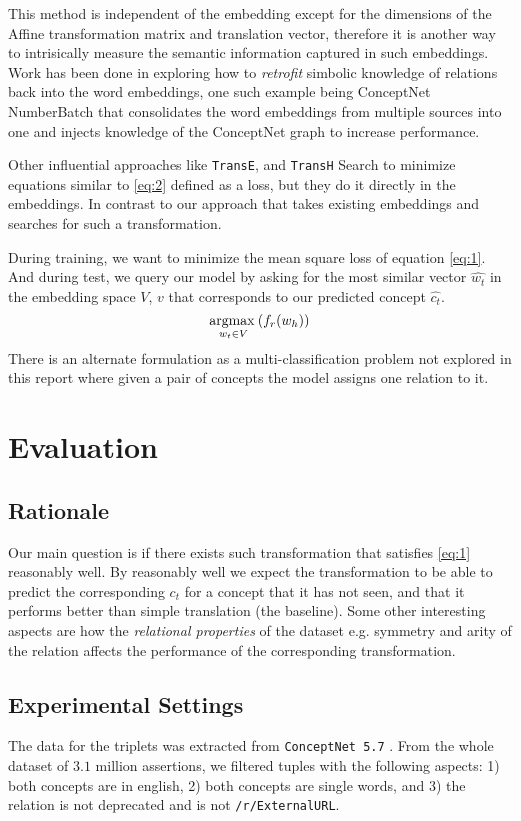 This method is independent of the embedding except for the dimensions of the Affine transformation matrix and translation vector,
therefore it is another way to intrisically measure the semantic information captured in such embeddings.
Work \cite{retrofitting} has been done in exploring how to \textit{retrofit} simbolic knowledge of
relations back into the word embeddings, one such example being ConceptNet NumberBatch\cite{numberBatch}
that consolidates the word embeddings from multiple sources into one and injects knowledge
of the ConceptNet graph to increase performance.

Other influential approaches like \texttt{TransE}, \cite{transE} and
\texttt{TransH} \cite{transH}
Search to minimize equations similar to \eqref{eq:2} defined as a loss,
but they do it directly in the embeddings.
In contrast to our approach that takes existing embeddings and searches for such a transformation.

During training, we want to minimize the mean square loss of equation \eqref{eq:1}.
And during test, we query our model by asking for
the most similar vector $\widehat{w_t}$ in the embedding space $V$, $v$ that corresponds
to our predicted concept $\widehat{c_t}$.
\begin{equation}
    \operatorname*{argmax\:}_{w_t \in V} ( f_r(w_h) )
\end{equation}
There is an alternate formulation as a multi-classification problem not explored in this report
where given a pair of concepts the model assigns one relation to it.


\section{Evaluation}
\subsection{Rationale}
Our main question is if there exists such transformation that satisfies \eqref{eq:1} reasonably well.
By reasonably well we expect the transformation to be able to predict the corresponding $c_t$
for a concept that it has not seen, and that it performs better than simple translation (the baseline).
Some other interesting aspects are how the \emph{relational properties} of the dataset e.g.
symmetry and arity of the relation affects the performance of the corresponding transformation.

\subsection{Experimental Settings}
The data for the triplets was extracted from \texttt{ConceptNet 5.7} \cite{conceptnet}.
From the whole dataset of $3.1$ million assertions, we filtered tuples with the following aspects:
1) both concepts are in english, 2) both concepts are single words, and 3) the relation is not deprecated and is not \texttt{/r/ExternalURL}.

